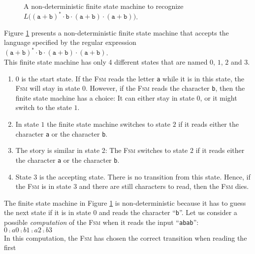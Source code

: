 \begin{figure}[!ht]
  \centering
   \caption{A non-deterministic finite state machine to recognize 
           $L\bigl((\texttt{a}+\texttt{b})^* \cdot \texttt{b} \cdot (\texttt{a}+\texttt{b}) \cdot (\texttt{a}+\texttt{b})\bigr)$.}
  \label{fig:abstarbabab-nd.dot}
\end{figure}
\noindent
Figure \ref{fig:abstarbabab-nd.dot} presents a non-deterministic finite state machine that accepts
the language specified by the regular expression
\\[0.2cm]
\hspace*{1.3cm}
$(\texttt{a}+\texttt{b})^* \cdot \texttt{b} \cdot (\texttt{a}+\texttt{b}) \cdot (\texttt{a}+\texttt{b})$.
\\[0.2cm]
This finite state machine has only 4 different states that are named $0$, $1$, $2$ and $3$.
\begin{enumerate}
\item $0$ is the start state.  If the \textsc{Fsm} reads the letter \texttt{a} while it is in this
      state, the \textsc{Fsm} will stay in state 0.  However, if the \textsc{Fsm} reads the
      character \texttt{b}, then the finite state machine has a choice:  It can either stay in state
      $0$, or it might switch to the state $1$.
\item In state $1$ the finite state machine switches to state $2$ if it reads either the character
      \texttt{a} or the character \texttt{b}.
\item The story is similar in state 2: The \textsc{Fsm} switches to state $2$ if it reads either the character
      \texttt{a} or the character \texttt{b}.
\item State  $3$ is the accepting state.  There is no transition from this state.  Hence, if the
      \textsc{Fsm} is in state 3 and there are still characters to read, then the \textsc{Fsm} dies.
\end{enumerate}
The finite state machine in Figure \ref{fig:abstarbabab-nd.dot} is non-deterministic because it has
to guess the next state if it is in state 0 and reads the character ``\texttt{b}''.  Let us consider a possible
\emph{computation} of the \textsc{Fsm} when it reads the input ``\texttt{abab}'':
\\[0.2cm]
\hspace*{1.3cm}
$0 \comp{a} 0 \comp{b} 1 \comp{a} 2 \comp{b} 3$
\\[0.2cm]
In this computation, the \textsc{Fsm} has chosen the correct transition when reading the first
